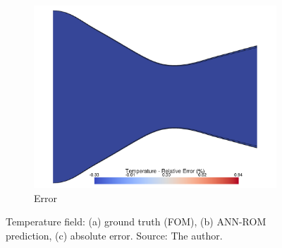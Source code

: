 \documentclass[tg, EN]{ufabcFHZh_tg}
\begin{document}
\begin{figure}[H]
\begin{subfigure}[b]{0.32\textwidth}
        \includegraphics[width=\textwidth]{Figuras/nn_error_temperature.pdf}
        \caption{Error}
    \end{subfigure}
    \caption{Temperature field: (a) ground truth (FOM), (b) ANN-ROM prediction, (c) absolute error. Source: The author.}
    \label{fig:nn_reconstruction_temperature}
\end{figure}
\end{document}
